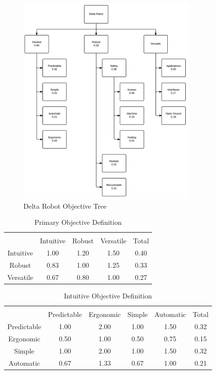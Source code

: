 \documentclass[11pt]{report}
\begin{document}
\begin{figure}[h]
	\centering
	\includegraphics[width=0.8\textwidth]{objectivetree.png}
	\caption{Delta Robot Objective Tree}
	\label{fig:objectivetree}
\end{figure}

\begin{table}[ht] 
	\caption{Primary Objective Definition}
	\label{table:primary}
	\centering 
	\begin{tabular}{c c c c c} 
		\hline\hline \\
		 			& Intuitive 	& Robust 		& Versatile 	& Total\\ 
		Intuitive 	& 1.00 		& 1.20 		& 1.50 		& 0.40 \\ 
		Robust 		& 0.83 		& 1.00 		& 1.25		& 0.33 \\ 
		Versatile 	& 0.67 		& 0.80 		& 1.00 		& 0.27 \\ 
	\end{tabular} 
\end{table}

\begin{table}[ht] 
	\caption{Intuitive Objective Definition}
	\label{table:intuitive}
	\centering 
	\begin{tabular}{c c c c c c} 
		\hline\hline \\
		 			& Predictable	& Ergonomic	& Simple 		& Automatic 	& Total\\ 
		Predictable 	& 1.00 		& 2.00 		& 1.00 		& 1.50 		& 0.32 \\ 
		Ergonomic		& 0.50 		& 1.00 		& 0.50		& 0.75 		& 0.15 \\ 
		Simple	 	& 1.00 		& 2.00 		& 1.00 		& 1.50 		& 0.32 \\ 
		Automatic	 	& 0.67		& 1.33 		& 0.67 		& 1.00 		& 0.21 \\ 
	\end{tabular} 
\end{table}
\end{document}
